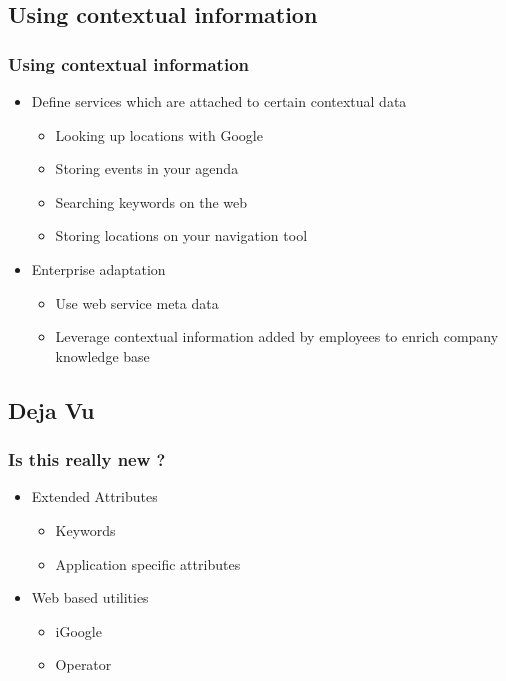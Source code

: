\documentclass{beamer}
\begin{document}
\subsection[Using contextual information]{Using contextual information}

\begin{frame}
\frametitle{Using contextual information}

\begin{itemize}
  \item Define services which are attached to certain contextual data
  \begin{itemize}
    \item Looking up locations with Google
  	\item Storing events in your agenda
  	\item Searching keywords on the web
  	\item Storing locations on your navigation tool
	\end{itemize}
  \item Enterprise adaptation
  \begin{itemize}
  	\item Use web service meta data
  	\item Leverage contextual information added by employees to enrich company
  	knowledge base
\end{itemize} 
\end{itemize}
\end{frame}

\subsection[Deja Vu]{Deja Vu}

\begin{frame}
\frametitle{Is this really new ?}

\begin{itemize}
  \item Extended Attributes
  \begin{itemize}
  	\item Keywords
  	\item Application specific attributes
  \end{itemize}
  \item Web based utilities
  \begin{itemize}
    \item iGoogle
    \item Operator 
   \end{itemize} 
\end{itemize}
\end{frame}
\end{document}
